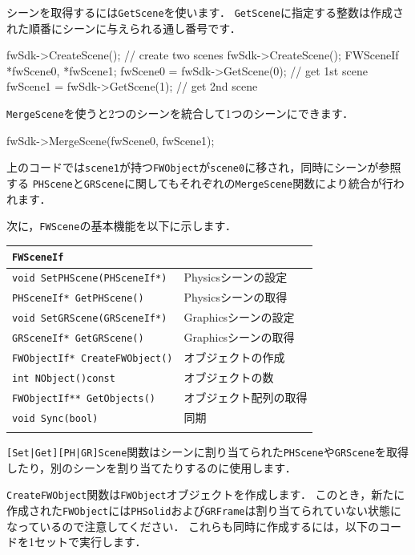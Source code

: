 \KLUDGE シーンを取得するには\texttt{GetScene}を使います．
\texttt{GetScene}に指定する整数は作成された順番にシーンに与えられる通し番号です．
\KLUDGE %
\begin{sourcecode}
fwSdk->CreateScene();               // create two scenes
fwSdk->CreateScene();
FWSceneIf *fwScene0, *fwScene1;
fwScene0 = fwSdk->GetScene(0);      // get 1st scene
fwScene1 = fwSdk->GetScene(1);      // get 2nd scene
\end{sourcecode}

\texttt{MergeScene}を使うと2つのシーンを統合して1つのシーンにできます．
\begin{sourcecode}
fwSdk->MergeScene(fwScene0, fwScene1);
\end{sourcecode}
\KLUDGE 上のコードでは\texttt{scene1}が持つ\texttt{FWObject}が\texttt{scene0}に移され，同時にシーンが参照する
\texttt{PHScene}と\texttt{GRScene}に関してもそれぞれの\texttt{MergeScene}関数により統合が行われます．

\KLUDGE 次に，\texttt{FWScene}の基本機能を以下に示します．

\noindent
\begin{tabular}{p{.6\hsize}p{.3\hsize}}
\\
\texttt{FWSceneIf}													\\ \midrule
\texttt{void SetPHScene(PHSceneIf*)}	& Physicsシーンの設定		\\
\texttt{PHSceneIf* GetPHScene()}		& Physicsシーンの取得		\\
\texttt{void SetGRScene(GRSceneIf*)}	& Graphicsシーンの設定		\\
\texttt{GRSceneIf* GetGRScene()}		& Graphicsシーンの取得		\\
\texttt{FWObjectIf* CreateFWObject()}	& オブジェクトの作成		\\
\texttt{int NObject()const}				& オブジェクトの数			\\
\texttt{FWObjectIf** GetObjects()}		& オブジェクト配列の取得	\\
\texttt{void Sync(bool)}				& 同期						\\
\\
\end{tabular}

\texttt{[Set|Get][PH|GR]Scene}関数はシーンに割り当てられた\texttt{PHScene}や\texttt{GRScene}を取得したり，別のシーンを割り当てたりするのに使用します．

\texttt{CreateFWObject}関数は\texttt{FWObject}オブジェクトを作成します．
\KLUDGE このとき，新たに作成された\texttt{FWObject}には\texttt{PHSolid}および\texttt{GRFrame}は割り当てられていない状態になっているので注意してください．
\KLUDGE これらも同時に作成するには，以下のコードを1セットで実行します．

